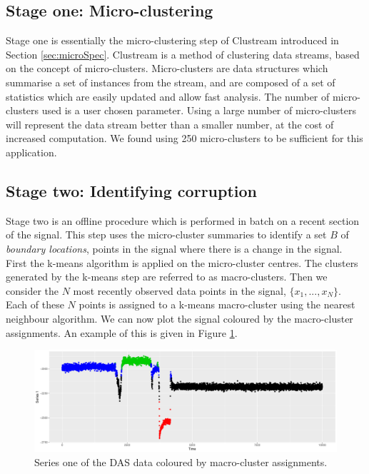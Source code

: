 \subsection{Stage one: Micro-clustering}
\label{sec:das_stage_1}

Stage one is essentially the micro-clustering step of Clustream introduced in Section \ref{sec:microSpec}.  Clustream is a method of clustering data streams, based on the concept of micro-clusters. Micro-clusters are data structures which summarise a set of instances from the stream, and are composed of a set of statistics which are easily updated and allow fast analysis.  The number of micro-clusters used is a user chosen parameter. Using a large number of micro-clusters will represent the data stream better than a smaller number, at the cost of increased computation. We found using 250 micro-clusters to be sufficient for this application. 
\subsection{Stage two: Identifying corruption}
\label{sec:das_stage_2}

Stage two is an offline procedure which is performed in batch on a recent section of the signal. This step uses the micro-cluster summaries to identify a set $B$ of \textit{boundary locations}, points in the signal where there is a change in the signal. First the k-means algorithm is applied on the micro-cluster centres. The clusters generated by the k-means step are referred to as macro-clusters. Then we consider the  $N$ most recently observed data points in the signal, $\{ x_1, ..., x_N \}$. Each of these $N$ points is assigned to a k-means macro-cluster using the nearest neighbour algorithm. We can now plot the signal coloured by the macro-cluster assignments. An example of this is given in Figure \ref{fig:das_kmeans_col}.  

\begin{figure}[h]
  \centering
  \includegraphics[width = 13cm]{k_4_rep_1_series_1.pdf}
  \caption{Series one of the DAS data coloured by macro-cluster assignments.}
  \label{fig:das_kmeans_col}
\end{figure}

